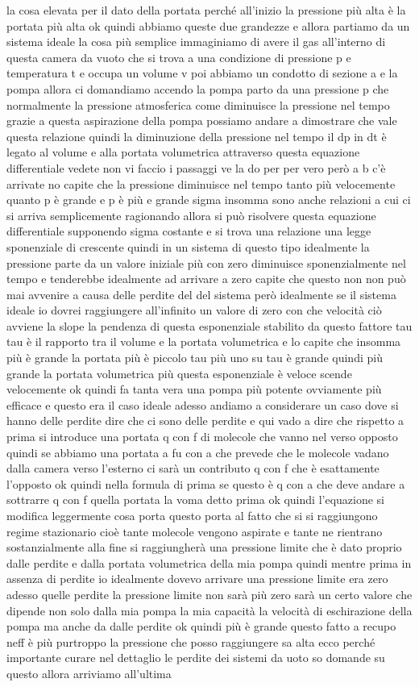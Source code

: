 la cosa elevata per il dato della portata perché all'inizio la pressione più alta è la portata più alta ok quindi abbiamo queste due grandezze e allora partiamo da un sistema ideale la cosa più semplice immaginiamo di avere il gas all'interno di questa camera da vuoto che si trova a una condizione di pressione p e temperatura t e occupa un volume v poi abbiamo un condotto di sezione a e la pompa allora ci domandiamo accendo la pompa parto da una pressione p che normalmente la pressione atmosferica come diminuisce la pressione nel tempo grazie a questa aspirazione della pompa possiamo andare a dimostrare che vale questa relazione quindi la diminuzione della pressione nel tempo il dp in dt è legato al volume e alla portata volumetrica attraverso questa equazione differentiale vedete non vi faccio i passaggi ve la do per per vero però a b c'è arrivate no capite che la pressione diminuisce nel tempo tanto più velocemente quanto p è grande e p è più e grande sigma insomma sono anche relazioni a cui ci si arriva semplicemente ragionando allora si può risolvere questa equazione differentiale supponendo sigma costante e si trova una relazione una legge sponenziale di crescente quindi in un sistema di questo tipo idealmente la pressione parte da un valore iniziale più con zero diminuisce sponenzialmente nel tempo e tenderebbe idealmente ad arrivare a zero capite che questo non non può mai avvenire a causa delle perdite del del sistema però idealmente se il sistema ideale io dovrei raggiungere all'infinito un valore di zero con che velocità ciò avviene la slope la pendenza di questa esponenziale stabilito da questo fattore tau tau è il rapporto tra il volume e la portata volumetrica e lo capite che insomma più è grande la portata più è piccolo tau più uno su tau è grande quindi più grande la portata volumetrica più questa esponenziale è veloce scende velocemente ok quindi fa tanta vera una pompa più potente ovviamente più efficace e questo era il caso ideale adesso andiamo a considerare un caso dove si hanno delle perdite dire che ci sono delle perdite e qui vado a dire che rispetto a prima si introduce una portata q con f di molecole che vanno nel verso opposto quindi se abbiamo una portata a fu con a che prevede che le molecole vadano dalla camera verso l'esterno ci sarà un contributo q con f che è esattamente l'opposto ok quindi nella formula di prima se questo è q con a che deve andare a sottrarre q con f quella portata la voma detto prima ok quindi l'equazione si modifica leggermente cosa porta questo porta al fatto che si si raggiungono regime stazionario cioè tante molecole vengono aspirate e tante ne rientrano sostanzialmente alla fine si raggiungherà una pressione limite che è dato proprio dalle perdite e dalla portata volumetrica della mia pompa quindi mentre prima in assenza di perdite io idealmente dovevo arrivare una pressione limite era zero adesso quelle perdite la pressione limite non sarà più zero sarà un certo valore che dipende non solo dalla mia pompa la mia capacità la velocità di eschirazione della pompa ma anche da dalle perdite ok quindi più è grande questo fatto a recupo neff è più purtroppo la pressione che posso raggiungere sa alta ecco perché importante curare nel dettaglio le perdite dei sistemi da uoto so domande su questo allora arriviamo all'ultima 